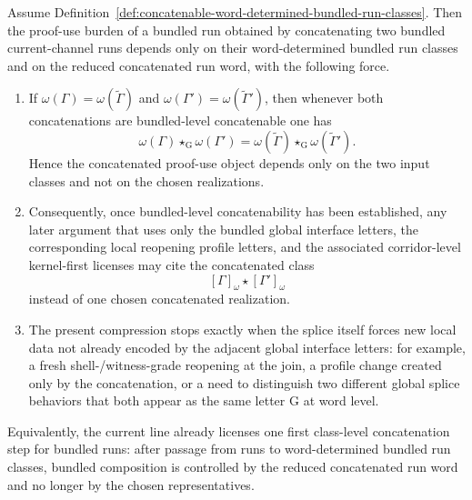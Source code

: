 \begin{proposition}
\label{prop:first-run-class-concatenation-principle}
Assume Definition~\ref{def:concatenable-word-determined-bundled-run-classes}. Then the proof-use burden of a bundled run obtained by concatenating two bundled current-channel runs depends only on their word-determined bundled run classes and on the reduced concatenated run word, with the following force.
\begin{enumerate}[leftmargin=2em,label=(\roman*)]
\item If $\omega(\Gamma)=\omega(\widetilde\Gamma)$ and $\omega(\Gamma')=\omega(\widetilde\Gamma')$, then whenever both concatenations are bundled-level concatenable one has
\[
\omega(\Gamma)\star_{\mathrm G}\omega(\Gamma')
=
\omega(\widetilde\Gamma)\star_{\mathrm G}\omega(\widetilde\Gamma').
\]
Hence the concatenated proof-use object depends only on the two input classes and not on the chosen realizations.
\item Consequently, once bundled-level concatenability has been established, any later argument that uses only the bundled global interface letters, the corresponding local reopening profile letters, and the associated corridor-level kernel-first licenses may cite the concatenated class
\[
[\Gamma]_{\omega}\star[\Gamma']_{\omega}
\]
instead of one chosen concatenated realization.
\item The present compression stops exactly when the splice itself forces new local data not already encoded by the adjacent global interface letters: for example, a fresh shell-/witness-grade reopening at the join, a profile change created only by the concatenation, or a need to distinguish two different global splice behaviors that both appear as the same letter $\mathrm G$ at word level.
\end{enumerate}
Equivalently, the current line already licenses one first class-level concatenation step for bundled runs: after passage from runs to word-determined bundled run classes, bundled composition is controlled by the reduced concatenated run word and no longer by the chosen representatives.
\end{proposition}

